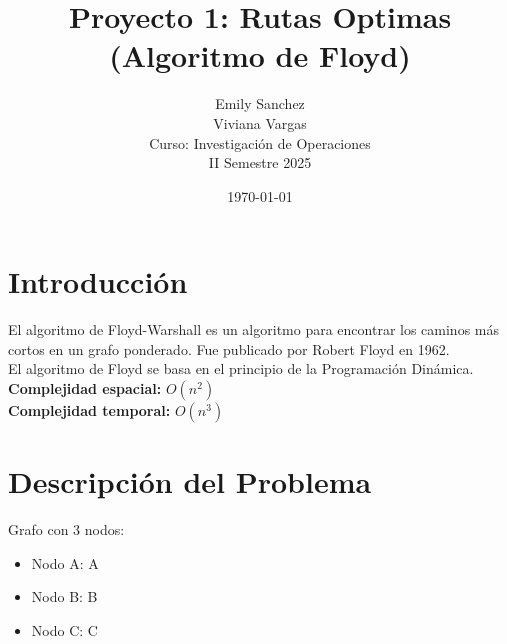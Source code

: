 \documentclass[12pt]{article}
\title{Proyecto 1: Rutas Optimas (Algoritmo de Floyd)}
\author{Emily Sanchez \\ Viviana Vargas \\[1cm] Curso: Investigación de Operaciones \\ II Semestre 2025}
\date{\today}
\begin{document}
\maketitle
\thispagestyle{empty}
\newpage
\setcounter{page}{1}

\section{Introducción}
El algoritmo de Floyd-Warshall es un algoritmo para encontrar los caminos más cortos en un grafo ponderado. Fue publicado por Robert Floyd en 1962.\\
El algoritmo de Floyd se basa en el principio de la Programación Dinámica.\\
\textbf{Complejidad espacial:} $O(n^2)$\\
\textbf{Complejidad temporal:} $O(n^3)$\\
\clearpage
\section{Descripción del Problema}
Grafo con 3 nodos:

\begin{itemize}
\item Nodo A: A
\item Nodo B: B
\item Nodo C: C
\end{itemize}
\end{document}
